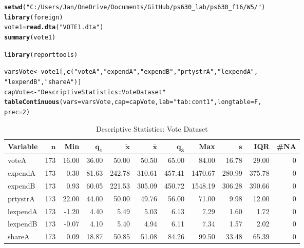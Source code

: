 \documentclass[12pt]{article}\usepackage[]{graphicx}\usepackage[]{color}
\makeatletter
\newcommand{\hlnum}[1]{\textcolor[rgb]{0.686,0.059,0.569}{#1}}%
\newcommand{\hlstr}[1]{\textcolor[rgb]{0.192,0.494,0.8}{#1}}%
\newcommand{\hlstd}[1]{\textcolor[rgb]{0.345,0.345,0.345}{#1}}%
\newcommand{\hlkwb}[1]{\textcolor[rgb]{0.69,0.353,0.396}{#1}}%
\newcommand{\hlkwc}[1]{\textcolor[rgb]{0.333,0.667,0.333}{#1}}%
\newcommand{\hlkwd}[1]{\textcolor[rgb]{0.737,0.353,0.396}{\textbf{#1}}}%
\newenvironment{kframe}{%
 \def\at@end@of@kframe{}%
 \ifinner\ifhmode%
  \def\at@end@of@kframe{\end{minipage}}%
  \begin{minipage}{\columnwidth}%
 \fi\fi%
 \def\FrameCommand##1{\hskip\@totalleftmargin \hskip-\fboxsep
 \colorbox{shadecolor}{##1}\hskip-\fboxsep
     \hskip-\linewidth \hskip-\@totalleftmargin \hskip\columnwidth}%
 \MakeFramed {\advance\hsize-\width
   \@totalleftmargin\z@ \linewidth\hsize
   \@setminipage}}%
 {\par\unskip\endMakeFramed%
 \at@end@of@kframe}
\newenvironment{knitrout}{}{} %
\makeatother
\begin{document}
\begin{knitrout}
\color{fgcolor}\begin{kframe}
\begin{alltt}
\hlkwd{setwd}\hlstd{(}\hlstr{"C:/Users/Jan/OneDrive/Documents/GitHub/ps630_lab/ps630_f16/W5/"}\hlstd{)}
\hlkwd{library}\hlstd{(foreign)}
\hlstd{vote1} \hlkwb{=} \hlkwd{read.dta}\hlstd{(}\hlstr{"VOTE1.dta"}\hlstd{)}
\hlkwd{summary}\hlstd{(vote1)}

\hlkwd{library}\hlstd{(reporttools)}
\end{alltt}


{\ttfamily\noindent\itshape\color{messagecolor}{\#\# Loading required package: xtable}}\begin{alltt}
\hlstd{varsVote} \hlkwb{<-} \hlstd{vote1[,} \hlkwd{c}\hlstd{(}\hlstr{"voteA"}\hlstd{,} \hlstr{"expendA"}\hlstd{,} \hlstr{"expendB"}\hlstd{,} \hlstr{"prtystrA"}\hlstd{,} \hlstr{"lexpendA"}\hlstd{,}
    \hlstr{"lexpendB"}\hlstd{,} \hlstr{"shareA"}\hlstd{)]}
\hlstd{capVote} \hlkwb{<-} \hlstr{"Descriptive Statistics: Vote Dataset"}
\hlkwd{tableContinuous}\hlstd{(}\hlkwc{vars} \hlstd{= varsVote,} \hlkwc{cap} \hlstd{= capVote,} \hlkwc{lab} \hlstd{=} \hlstr{"tab: cont1"}\hlstd{,} \hlkwc{longtable} \hlstd{= F,}
    \hlkwc{prec} \hlstd{=} \hlnum{2}\hlstd{)}
\end{alltt}
\end{kframe}
\end{knitrout}

\begin{table}[ht]
\centering
\begingroup\footnotesize
\begin{tabular}{lrrrrrrrrrr}
 \textbf{Variable} & $\mathbf{n}$ & \textbf{Min} & $\mathbf{q_1}$ & $\mathbf{\widetilde{x}}$ & $\mathbf{\bar{x}}$ & $\mathbf{q_3}$ & \textbf{Max} & $\mathbf{s}$ & \textbf{IQR} & \textbf{\#NA} \\ 
  \hline
voteA & 173 & 16.00 & 36.00 &  50.00 &  50.50 &  65.00 &   84.00 &  16.78 &  29.00 & 0 \\ 
  expendA & 173 &  0.30 & 81.63 & 242.78 & 310.61 & 457.41 & 1470.67 & 280.99 & 375.78 & 0 \\ 
  expendB & 173 &  0.93 & 60.05 & 221.53 & 305.09 & 450.72 & 1548.19 & 306.28 & 390.66 & 0 \\ 
  prtystrA & 173 & 22.00 & 44.00 &  50.00 &  49.76 &  56.00 &   71.00 &   9.98 &  12.00 & 0 \\ 
  lexpendA & 173 & -1.20 &  4.40 &   5.49 &   5.03 &   6.13 &    7.29 &   1.60 &   1.72 & 0 \\ 
  lexpendB & 173 & -0.07 &  4.10 &   5.40 &   4.94 &   6.11 &    7.34 &   1.57 &   2.02 & 0 \\ 
  shareA & 173 &  0.09 & 18.87 &  50.85 &  51.08 &  84.26 &   99.50 &  33.48 &  65.39 & 0 \\ 
  \end{tabular}
\endgroup
\caption{Descriptive Statistics: Vote Dataset} 
\label{tab: cont1}
\end{table}
\end{document}
